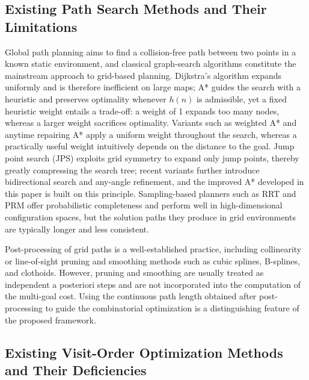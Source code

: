 \subsection{Existing Path Search Methods and Their Limitations}

Global path planning aims to find a collision-free path between two points in a known static environment, and classical graph-search algorithms constitute the mainstream approach to grid-based planning\textcolor{blue}{\cite{ref33,ref34,ref35}}. Dijkstra's algorithm expands uniformly and is therefore inefficient on large maps\textcolor{blue}{\cite{ref6}}; A* guides the search with a heuristic and preserves optimality whenever $h(n)$ is admissible\textcolor{blue}{\cite{ref5}}, yet a fixed heuristic weight entails a trade-off: a weight of 1 expands too many nodes, whereas a larger weight sacrifices optimality\textcolor{blue}{\cite{ref8}}. Variants such as weighted A* and anytime repairing A* apply a uniform weight throughout the search\textcolor{blue}{\cite{ref8,ref10}}, whereas a practically useful weight intuitively depends on the distance to the goal. Jump point search (JPS) exploits grid symmetry to expand only jump points, thereby greatly compressing the search tree\textcolor{blue}{\cite{ref11,ref12,ref44}}; recent variants further introduce bidirectional search and any-angle refinement\textcolor{blue}{\cite{ref13,ref14,ref15}}, and the improved A* developed in this paper is built on this principle. Sampling-based planners such as RRT\textcolor{blue}{\cite{ref7}} and PRM offer probabilistic completeness and perform well in high-dimensional configuration spaces, but the solution paths they produce in grid environments are typically longer and less consistent.

Post-processing of grid paths is a well-established practice, including collinearity or line-of-sight pruning\textcolor{blue}{\cite{ref16}} and smoothing methods such as cubic splines, B-splines, and clothoids\textcolor{blue}{\cite{ref17,ref18,ref41}}. However, pruning and smoothing are usually treated as independent a posteriori steps and are not incorporated into the computation of the multi-goal cost. Using the continuous path length obtained after post-processing to guide the combinatorial optimization is a distinguishing feature of the proposed framework.

\subsection{Existing Visit-Order Optimization Methods and Their Deficiencies}

